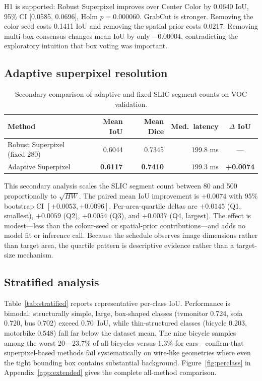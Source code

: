 H1 is supported: Robust Superpixel improves over Center Color by 0.0640 IoU, 95\% CI [0.0585, 0.0696], Holm $p=0.000060$. GrabCut is stronger. Removing the color seed costs 0.1411 IoU and removing the spatial prior costs 0.0217. Removing multi-box consensus changes mean IoU by only $-0.00004$, contradicting the exploratory intuition that box voting was important.

\subsection{Adaptive superpixel resolution}

\begin{table}[ht]
\centering
\caption{Secondary comparison of adaptive and fixed SLIC segment counts on VOC validation.}
\begin{tabular}{lrrrc}
\toprule
Method & Mean IoU & Mean Dice & Med.\ latency & $\Delta$ IoU \\
\midrule
Robust Superpixel (fixed 280) & 0.6044 & 0.7345 & 199.8 ms & --- \\
Adaptive Superpixel & \textbf{0.6117} & \textbf{0.7410} & 199.3 ms & \textbf{+0.0074} \\
\bottomrule
\end{tabular}
\end{table}

This secondary analysis scales the SLIC segment count between 80 and 500 proportionally to $\sqrt{HW}$. The paired mean IoU improvement is $+0.0074$ with 95\% bootstrap CI $[+0.0053, +0.0096]$. Per-area-quartile deltas are $+0.0145$ (Q1, smallest), $+0.0059$ (Q2), $+0.0054$ (Q3), and $+0.0037$ (Q4, largest). The effect is modest---less than the colour-seed or spatial-prior contributions---and adds no model fit or inference call. Because the schedule observes image dimensions rather than target area, the quartile pattern is descriptive evidence rather than a target-size mechanism.

\subsection{Stratified analysis}

Table~\ref{tab:stratified} reports representative per-class IoU. Performance is bimodal: structurally simple, large, box-shaped classes (tvmonitor 0.724, sofa 0.720, bus 0.702) exceed 0.70~IoU, while thin-structured classes (bicycle 0.203, motorbike 0.548) fall far below the dataset mean. The nine bicycle samples among the worst 20---23.7\% of all bicycles versus 1.3\% for cars---confirm that superpixel-based methods fail systematically on wire-like geometries where even the tight bounding box contains substantial background. Figure~\ref{fig:perclass} in Appendix~\ref{app:extended} gives the complete all-method comparison.

